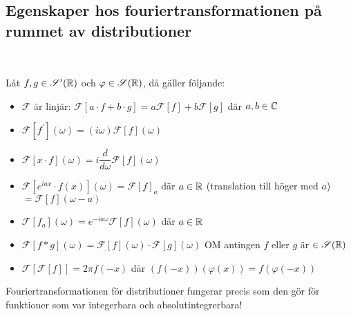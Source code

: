 \subsection{Egenskaper hos fouriertransformationen på rummet av distributioner}\hfill\\\par
\noindent Låt $f,g\in\mathscr{S}^{\prime}(\mathbb{R})$ och $\varphi\in\mathscr{S}(\mathbb{R})$, då gäller följande:\par
\begin{itemize}
  \item $\mathcal{F}$ är linjär: $\mathcal{F}\left[a\cdot f+b\cdot g\right] = a\mathcal{F}\left[f\right] + b\mathcal{F}\left[g\right]$ där $a,b\in\mathbb{C}$\par
  \item$\mathcal{F}\left[f^{\prime}\right](\omega) = (i\omega)\mathcal{F}\left[f\right](\omega)$\par
  \item $\mathcal{F}\left[x\cdot f\right](\omega) = i\dfrac{d}{d\omega}\mathcal{F}\left[f\right](\omega)$\par
  \item $\mathcal{F}\left[e^{iax}\cdot f(x)\right](\omega) = \mathcal{F}\left[f\right]_a$ där $a\in\mathbb{R}$ (translation till höger med $a$) $=\mathcal{F}\left[f\right](\omega-a)$\par
  \item $\mathcal{F}\left[f_a\right](\omega) = e^{-ia\omega}\mathcal{F}\left[f\right](\omega)$ där $a\in\mathbb{R}$\par
  \item $\mathcal{F}\left[f*g\right](\omega) = \mathcal{F}\left[f\right](\omega)\cdot\mathcal{F}\left[g\right](\omega)$ OM antingen $f$ eller $g$ är $\in\mathscr{S}(\mathbb{R})$ \par
  \item $\mathcal{F}\left[\mathcal{F}\left[f\right]\right] = 2\pi f(-x)$ där $\left(f(-x)\right)(\varphi(x)) = f(\varphi(-x))$
\end{itemize}
\par\bigskip
\noindent Fouriertransformationen för distributioner fungerar precis som den gör för funktioner som var integerbara och absolutintegrerbara!
